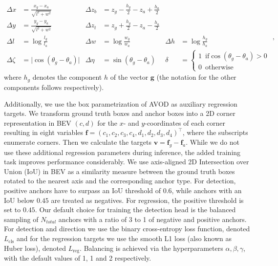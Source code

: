 \documentclass{article}
\begin{document}
\begin{equation}
\begin{aligned}
  \Delta x &= \frac{x_g - x_a}{\sqrt{l^2+w^2}} & 
  \Delta z_{b} &= z_g - \frac{h_g}{2} - z_a + \frac{h_a}{2} \\
  \Delta y &= \frac{y_g - y_a}{\sqrt{l^2+w^2}} & 
  \Delta z_{t} &= z_g + \frac{h_g}{2} - z_a - \frac{h_a}{2} \\
  \Delta l &= \log\frac{l_g}{l_a} &  \Delta w &= \log\frac{w_g}{w_a} & \Delta h &= \log\frac{h_g}{h_a} \\
  \Delta \zeta &= \lvert\cos(\theta_g - \theta_a)\rvert &
  \Delta \eta &= \sin{(\theta_g - \theta_a)} &
  \delta &= 
 \begin{cases}
     1 \enspace \text{if} \cos{(\theta_g - \theta_a)} > 0 \\ 
         0 \enspace \text{otherwise}
     \end{cases}
 \end{aligned},
 \label{eqn:box_regression}
 \end{equation}
 where $h_g$  denotes the component $h$ of the vector $\bm{g}$ (the notation 
 for the other components follows respectively).

Additionally, we use the box parametrization of AVOD \cite{Ku2018avod} as auxiliary regression targets. We transform ground truth boxes and anchor boxes into a 2D corner representation in BEV $(c,d)$ for the $x$- and $y$-coordinates of each corner resulting in eight variables $\bm{f} = (c_1, c_2, c_3, c_4, d_1, d_2, d_3, d_4)^\top$, where the subscripts enumerate corners. Then we calculate the targets $\bm{v} = \bm{f}_g - \bm{f}_a$.
While we do not use these additional regression parameters during inference, the added training task improves performance considerably.
We use axis-aligned 2D Intersection over Union (IoU) in BEV as a similarity measure between the ground truth boxes rotated to the nearest axis and the corresponding anchor type. 
For detection, positive anchors have to surpass an IoU threshold of $0.6$, while anchors with an IoU below $0.45$ are treated as negatives. 
For regression, the positive threshold is set to $0.45$. 
Our default choice for training the detection head is the balanced sampling of $N_{total}$ anchors with a ratio of 3 to 1 of negative and positive anchors. 
For detection and direction we use the binary cross-entropy loss function, denoted $L_{\text{cls}}$ and for the regression targets we use the smooth L1 loss (also known as Huber loss), denoted $L_{\text{reg}}$. Balancing is achieved via the hyperparameters $\alpha,\beta,\gamma$, with the default values of 1, 1 and 2 respectively.
\end{document}
